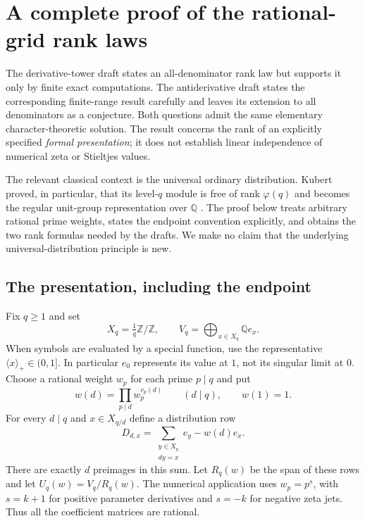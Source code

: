 \section{A complete proof of the rational-grid rank laws}
\label{rank:section}

The derivative-tower draft states an all-denominator rank law but supports it
only by finite exact computations.  The antiderivative draft states the
corresponding finite-range result carefully and leaves its extension to all
denominators as a conjecture.  Both questions admit the same elementary
character-theoretic solution.  The result concerns the rank of an explicitly
specified \emph{formal presentation}; it does not establish linear
independence of numerical zeta or Stieltjes values.

The relevant classical context is the universal ordinary distribution.
Kubert proved, in particular, that its level-$q$ module is free of rank
$\varphi(q)$ and becomes the regular unit-group representation over
$\mathbb Q$ \cite{Kubert1979}.  The proof below treats arbitrary rational
prime weights, states the endpoint convention explicitly, and obtains the
two rank formulas needed by the drafts.  We make no claim that the
underlying universal-distribution principle is new.

\subsection{The presentation, including the endpoint}

Fix $q\geq1$ and set
\[
 X_q=\tfrac1q\mathbb Z/\mathbb Z,
 \qquad V_q=\bigoplus_{x\in X_q}\mathbb Q e_x.
\]
When symbols are evaluated by a special function, use the representative
$\langle x\rangle_+\in(0,1]$.  In particular $e_0$ represents its value at
$1$, not its singular limit at $0$.  Choose a rational weight $w_p$ for each
prime $p\mid q$ and put
\[
 w(d)=\prod_{p\mid d}w_p^{v_p(d)}\qquad(d\mid q),
 \qquad w(1)=1.
\]
For every $d\mid q$ and $x\in X_{q/d}$ define a distribution row
\begin{equation}\label{rank:row}
 D_{d,x}=\sum_{\substack{y\in X_q\\dy=x}}e_y-w(d)e_x.
\end{equation}
There are exactly $d$ preimages in this sum.  Let $R_q(w)$ be the span of
these rows and let $U_q(w)=V_q/R_q(w)$.  The numerical application uses
$w_p=p^s$, with $s=k+1$ for positive parameter derivatives and $s=-k$ for
negative zeta jets.  Thus all the coefficient matrices are rational.

